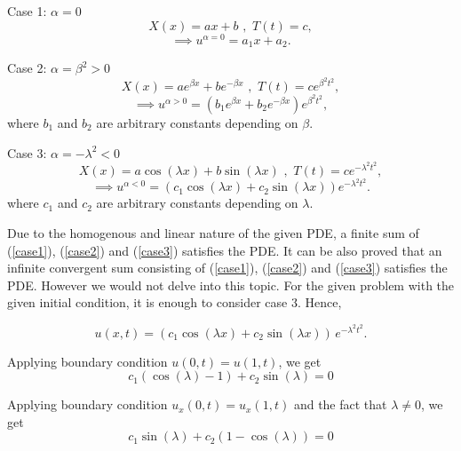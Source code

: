 \documentclass[12pt]{article}
\begin{document}
	Case 1: $\alpha=0$
	\begin{equation*}
	X(x)=ax+b\,\,,\,\, T(t)=c,
	\end{equation*}
	\begin{equation} \label{case1}
	\implies u^{\alpha=0}=a_1 x + a_2.
	\end{equation}
	
	Case 2: $\alpha = \beta^2 > 0$
	\begin{equation*}
	X(x)=ae^{\beta x}+be^{-\beta x}\,\,,\,\, T(t)=ce^{\beta^2 t^2},
	\end{equation*}
	\begin{equation}\label{case2}
	\implies u^{\alpha>0}=(b_1e^{\beta x}+b_2e^{-\beta x})e^{\beta^2 t^2},
	\end{equation}
	where $b_1$ and $b_2$ are arbitrary constants depending on $\beta$.
	
	Case 3: $\alpha = -\lambda^2 < 0$
	\begin{equation*}
	X(x)=a\cos({\lambda x})+b\sin({\lambda x})\,\,,\,\, T(t)=ce^{-\lambda^2 t^2},
	\end{equation*}
	\begin{equation}\label{case3}
	\implies u^{\alpha<0}=(c_1\cos({\lambda x})+c_2\sin({\lambda x}))e^{-\lambda^2 t^2}.
	\end{equation}
	where $c_1$ and $c_2$ are arbitrary constants depending on $\lambda$.
	
	Due to the homogenous and linear nature of the given PDE, a finite sum of (\ref{case1}), (\ref{case2}) and (\ref{case3}) satisfies the PDE. It can be also proved that an infinite convergent sum consisting of (\ref{case1}), (\ref{case2}) and (\ref{case3}) satisfies the PDE. However we would not delve into this topic. For the given problem with the given initial condition, it is enough to consider case 3. Hence, 
	
	\begin{equation}
	u(x,t) = \left(c_1\cos({\lambda x})+c_2\sin({\lambda x})\right)\,e^{-\lambda^2 t^2}.
	\end{equation}	
	
	Applying boundary condition $u(0,t) = u(1,t)$, we get		
	\begin{equation} \label{eq1}
	c_1(\cos({\lambda })-1)+c_2\sin({\lambda}) = 0
	\end{equation} 
	
	Applying boundary condition $u_x(0,t)=u_x(1,t)$ and the fact that $\lambda \neq 0$, we get	
	\begin{equation} \label{eq2}
	c_1\sin(\lambda) + c_2(1-\cos(\lambda))=0 \end{equation}
	
\end{document}
